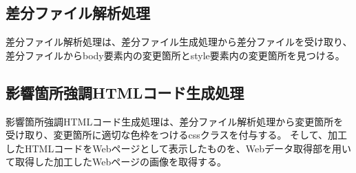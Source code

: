 \subsection{差分ファイル解析処理}\label{subsec:diff_file_analyze}
差分ファイル解析処理は、差分ファイル生成処理から差分ファイルを受け取り、差分ファイルからbody要素内の変更箇所とstyle要素内の変更箇所を見つける。

\subsection{影響箇所強調HTMLコード生成処理}\label{subsec:modified_html_generate}
影響箇所強調HTMLコード生成処理は、差分ファイル解析処理から変更箇所を受け取り、変更箇所に適切な色枠をつけるcssクラスを付与する。
そして、加工したHTMLコードをWebページとして表示したものを、Webデータ取得部を用いて取得した加工したWebページの画像を取得する。




